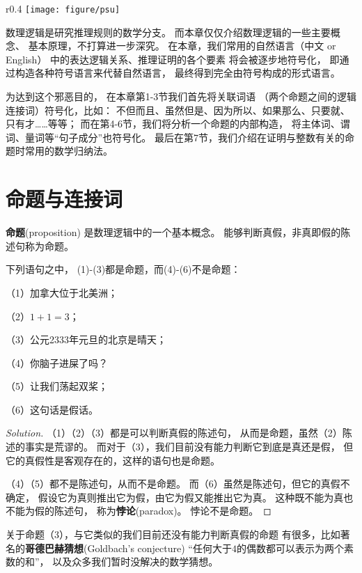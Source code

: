 
\begin{wrapfigure}{r}{0.4\textwidth}
\centering
\texttt{[image: figure/psu]}
\end{wrapfigure}数理逻辑是研究推理规则的数学分支。
而本章仅仅介绍数理逻辑的一些主要概念、
基本原理，不打算进一步深究。
在本章，我们常用的自然语言（中文 or English）
中的表达逻辑关系、推理证明的各个要素
将会被逐步地符号化，
即通过构造各种符号语言来代替自然语言，
最终得到完全由符号构成的形式语言。

为达到这个邪恶目的，
在本章第1-3节我们首先将关联词语
（两个命题之间的逻辑连接词）符号化，比如：
不但而且、虽然但是、因为所以、如果那么、只要就、只有才……等等；
而在第4-6节，我们将分析一个命题的内部构造，
将主体词、谓词、量词等“句子成分”也符号化。
最后在第7节，我们介绍在证明与整数有关的命题时常用的数学归纳法。


\section{命题与连接词}

\textbf{命题}(proposition)
是数理逻辑中的一个基本概念。
能够判断真假，非真即假的陈述句称为命题。

\begin{example}下列语句之中，
(1)-(3)都是命题，而(4)-(6)不是命题：

（1）加拿大位于北美洲；

（2）$1+1=3$；

（3）公元2333年元旦的北京是晴天；

（4）你脑子进屎了吗？

（5）让我们荡起双桨；

（6）这句话是假话。\label{examples of propositions}
\end{example}

\begin{proof}[Solution]
（1）（2）（3）都是可以判断真假的陈述句，
从而是命题，虽然（2）陈述的事实是荒谬的。
而对于（3），我们目前没有能力判断它到底是真还是假，
但它的真假性是客观存在的，这样的语句也是命题。

（4）（5）都不是陈述句，从而不是命题。
而（6）虽然是陈述句，但它的真假不确定，
假设它为真则推出它为假，由它为假又能推出它为真。
这种既不能为真也不能为假的陈述句，
称为\textbf{悖论}(paradox)。
悖论不是命题。
\end{proof}

关于命题（3），与它类似的我们目前还没有能力判断真假的命题
有很多，比如著名的\textbf{哥德巴赫猜想}(Goldbach's conjecture)
“任何大于$4$的偶数都可以表示为两个素数的和”，
以及众多我们暂时没解决的数学猜想。\vsp

